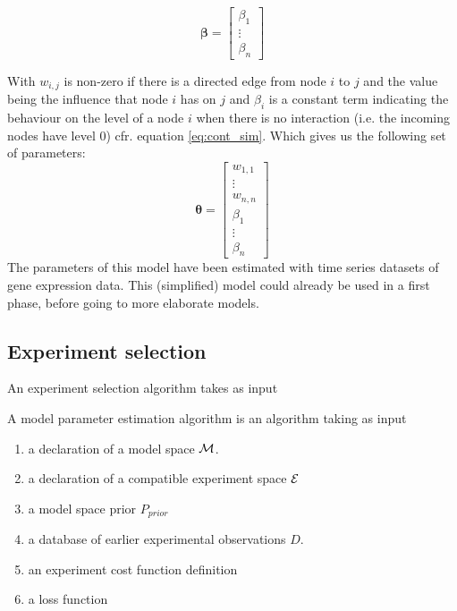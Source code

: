 \documentclass{article}
\begin{document}
\begin{equation}
 \mathbf{\beta} = \begin{bmatrix}
      \beta_1 \\
      \vdots \\
      \beta_n 
     \end{bmatrix}
\end{equation}

With $w_{i,j}$ is non-zero if there is a directed edge from node $i$ to $j$ and the value being the influence that node $i$ has on $j$ and $\beta_i$ is a constant term indicating the behaviour on the level of a node $i$ 
when there is no interaction (i.e. the incoming nodes have level 0) cfr. equation \ref{eq:cont_sim}. Which gives us the following set of parameters:
\begin{equation}
 \mathbf{\theta} = \begin{bmatrix}
                     w_{1,1} \\
                     \vdots \\
                     w_{n,n} \\
                     \beta_1 \\
                     \vdots \\
                     \beta_n
                    \end{bmatrix}
% 
\end{equation}
The parameters of this model have been estimated with time series datasets of gene expression data. This (simplified) model could already be used in a first phase, before going to more elaborate models.

\subsection{Experiment selection}

An experiment selection algorithm takes as input


A model parameter estimation algorithm is an algorithm taking as input
\begin{enumerate}
\item a declaration of a model space $\mathcal{M}$.
\item a declaration of a compatible experiment space $\mathcal{E}$
\item a model space prior $P_{prior}$
\item a database of earlier experimental observations $D$.
\item an experiment cost function definition
\item a loss function
\end{enumerate}
\end{document}
